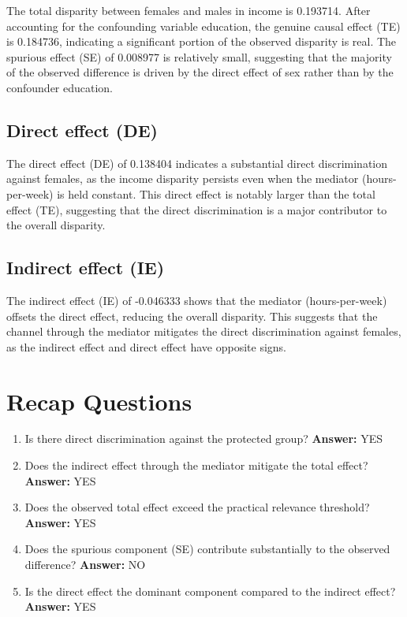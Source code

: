 \documentclass[11pt]{article}
\begin{document}
The total disparity between females and males in income is 0.193714. After accounting for the confounding variable education, the genuine causal effect (TE) is 0.184736, indicating a significant portion of the observed disparity is real. The spurious effect (SE) of 0.008977 is relatively small, suggesting that the majority of the observed difference is driven by the direct effect of sex rather than by the confounder education.

\subsection{Direct effect (DE)}

The direct effect (DE) of 0.138404 indicates a substantial direct discrimination against females, as the income disparity persists even when the mediator (hours-per-week) is held constant. This direct effect is notably larger than the total effect (TE), suggesting that the direct discrimination is a major contributor to the overall disparity.

\subsection{Indirect effect (IE)}

The indirect effect (IE) of -0.046333 shows that the mediator (hours-per-week) offsets the direct effect, reducing the overall disparity. This suggests that the channel through the mediator mitigates the direct discrimination against females, as the indirect effect and direct effect have opposite signs.

\section{Recap Questions}

\begin{enumerate}
\item Is there direct discrimination against the protected group? \textbf{Answer:} YES
\item Does the indirect effect through the mediator mitigate the total effect? \textbf{Answer:} YES
\item Does the observed total effect exceed the practical relevance threshold? \textbf{Answer:} YES
\item Does the spurious component (SE) contribute substantially to the observed difference? \textbf{Answer:} NO
\item Is the direct effect the dominant component compared to the indirect effect? \textbf{Answer:} YES
\end{enumerate}
\end{document}
